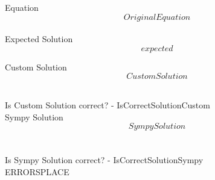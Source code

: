 \documentclass[12pt,fleqn]{article}
\begin{document}
Equation\\
$$OriginalEquation$$
\\

Expected Solution\\
$$expected$$

Custom Solution\\
$$CustomSolution$$

\\ Is Custom Solution correct? - IsCorrectSolutionCustom \\

Sympy Solution\\
$$SympySolution$$
\\
\\ Is Sympy Solution correct? - IsCorrectSolutionSympy \\

ERRORSPLACE
\end{document}

